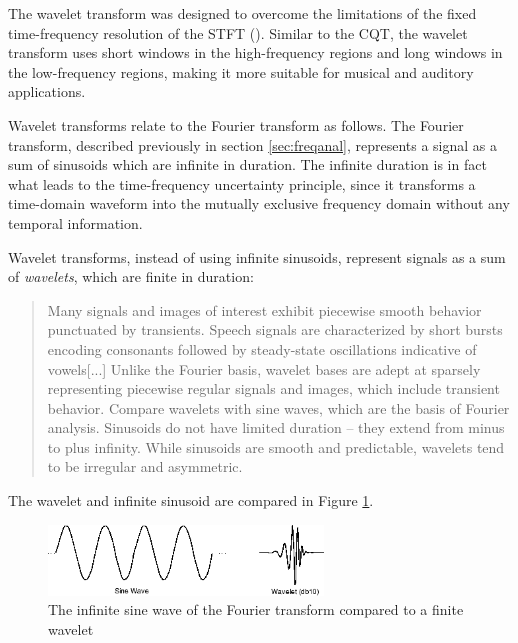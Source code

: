 \documentclass[report.tex]{subfiles}
\begin{document}
The wavelet transform was designed to overcome the limitations of the fixed time-frequency resolution of the STFT (\cite{wavelets1, wavelets2}). Similar to the CQT, the wavelet transform uses short windows in the high-frequency regions and long windows in the low-frequency regions, making it more suitable for musical and auditory applications.

Wavelet transforms relate to the Fourier transform as follows. The Fourier transform, described previously in section \ref{sec:freqanal}, represents a signal as a sum of sinusoids which are infinite in duration. The infinite duration is in fact what leads to the time-frequency uncertainty principle, since it transforms a time-domain waveform into the mutually exclusive frequency domain without any temporal information.

Wavelet transforms, instead of using infinite sinusoids, represent signals as a sum of \textit{wavelets}, which are finite in duration:

\begin{quote}
	Many signals and images of interest exhibit piecewise smooth behavior punctuated by transients. Speech signals are characterized by short bursts encoding consonants followed by steady-state oscillations indicative of vowels[...] Unlike the Fourier basis, wavelet bases are adept at sparsely representing piecewise regular signals and images, which include transient behavior. Compare wavelets with sine waves, which are the basis of Fourier analysis. Sinusoids do not have limited duration -- they extend from minus to plus infinity. While sinusoids are smooth and predictable, wavelets tend to be irregular and asymmetric.\footnotemark{}
\end{quote}

 The wavelet and infinite sinusoid are compared in Figure \ref{fig:waveletinf}.

\begin{figure}[ht]
	\centering
	\includegraphics[width=0.65\textwidth]{./images-wavelets/wavelet.png}
	\caption{The infinite sine wave of the Fourier transform compared to a finite wavelet\protect\footnotemark[\value{footnote}]}
	\label{fig:waveletinf}
\end{figure}

\end{document}
